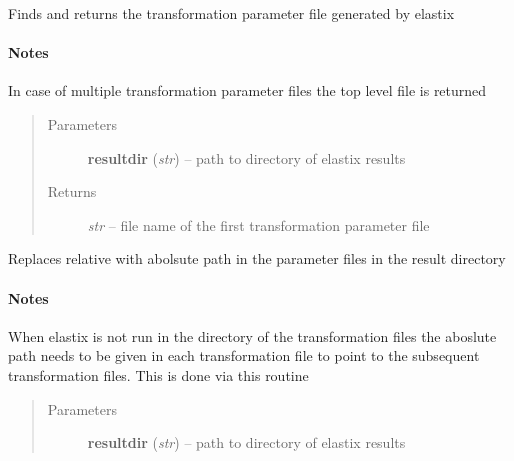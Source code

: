\documentclass[letterpaper,10pt,english]{sphinxmanual}
\begin{document}

\begin{fulllineitems}
\label{api/ClearMap.Alignment:ClearMap.Alignment.Elastix.getTransformParameterFile}
Finds and returns the transformation parameter file generated by elastix
\paragraph{Notes}

In case of multiple transformation parameter files the top level file is returned
\begin{quote}\begin{description}
\item[{Parameters}] \leavevmode
\textbf{resultdir} (\emph{str}) --
path to directory of elastix results

\item[{Returns}] \leavevmode
\emph{str} --
file name of the first transformation parameter file

\end{description}\end{quote}

\end{fulllineitems}


\begin{fulllineitems}
\label{api/ClearMap.Alignment:ClearMap.Alignment.Elastix.setPathTransformParameterFiles}
Replaces relative with abolsute path in the parameter files in the result directory
\paragraph{Notes}

When elastix is not run in the directory of the transformation files
the aboslute path needs to be given in each transformation file
to point to the subsequent transformation files. This is done via this
routine
\begin{quote}\begin{description}
\item[{Parameters}] \leavevmode
\textbf{resultdir} (\emph{str}) --
path to directory of elastix results

\end{description}\end{quote}

\end{fulllineitems}
\end{document}
